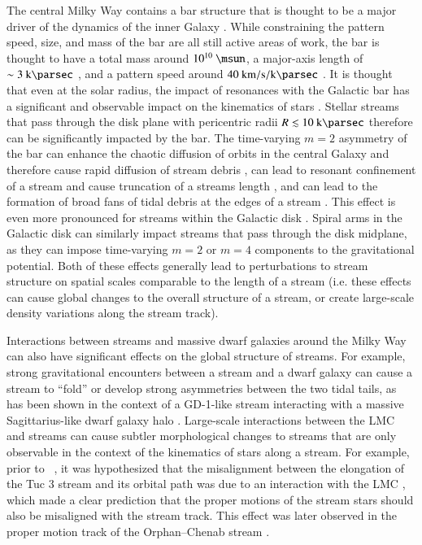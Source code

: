 \documentclass[final,5p,times,twocolumn,authoryear]{elsarticle}
\begin{document}
The central Milky Way contains a bar structure that is thought to be a major driver of
the dynamics of the inner Galaxy \citep[e.g.,][]{blitz:1991}.
While constraining the pattern speed, size, and mass of the bar are all still active
areas of work, the bar is thought to have a total mass around $10^{10}~\unit{\msun}$, a
major-axis length of $\sim 3~\kpc$ \citep[e.g.,][]{wegg:2015}, and a pattern speed
around $40~\unit{\kms\per\kpc}$ \citep[e.g.,][]{portail:2017, sanders:2019}.
It is thought that even at the solar radius, the impact of resonances with the Galactic
bar has a significant and observable impact on the kinematics of stars
\citep[e.g.,][]{dehnen:1999, kawata:2021}.
Stellar streams that pass through the disk plane with pericentric radii $R \lesssim
10~\kpc$ therefore can be significantly impacted by the bar.
The time-varying $m=2$ asymmetry of the bar can enhance the chaotic diffusion of orbits
in the central Galaxy and therefore cause rapid diffusion of stream debris
\citep{price-whelan:2016b}, can lead to resonant confinement of a stream and cause
truncation of a streams length \citep{hattori:2016}, and can lead to the formation of
broad fans of tidal debris at the edges of a stream \citep{pearson:2017}.
This effect is even more pronounced for streams within the Galactic disk
\citep{thomas:2023}.
Spiral arms in the Galactic disk can similarly impact streams that pass through the disk
midplane, as they can impose time-varying $m=2$ or $m=4$ components to the gravitational
potential.
Both of these effects generally lead to perturbations to stream structure on spatial
scales comparable to the length of a stream (i.e. these effects can cause global changes
to the overall structure of a stream, or create large-scale density variations along the
stream track).

Interactions between streams and massive dwarf galaxies around the Milky Way can also
have significant effects on the global structure of streams.
For example, strong gravitational encounters between a stream and a dwarf galaxy can
cause a stream to ``fold'' or develop strong asymmetries between the two tidal tails, as
has been shown in the context of a GD-1-like stream interacting with a massive
Sagittarius-like dwarf galaxy halo \citep{dillamore:2022}.
Large-scale interactions between the LMC and streams can cause subtler morphological
changes to streams that are only observable in the context of the kinematics of stars
along a stream.
For example, prior to \gaia\ , it was hypothesized that the misalignment between
the elongation of the Tuc 3 stream and its orbital path was due to an interaction with
the LMC \citep{erkal:2018}, which made a clear prediction that the proper motions of the
stream stars should also be misaligned with the stream track.
This effect was later observed in the proper motion track of the Orphan--Chenab stream
\citep{koposov:2019, erkal:2019}.
\end{document}
